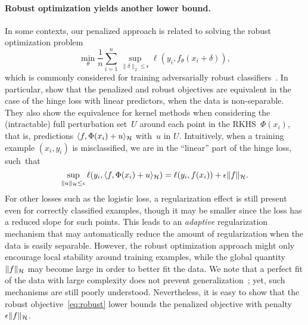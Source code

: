 \paragraph{Robust optimization yields another lower bound.}
In some contexts, our penalized approach is related to solving the robust optimization problem
\begin{equation}
\label{eq:robust}
\min_\theta \frac{1}{n} \sum_{i=1}^n \sup_{\|\delta\|_2 \leq \epsilon} \ell(y_i, f_\theta(x_i + \delta)),
\end{equation}
which is commonly considered for training adversarially robust classifiers~\citep{wong2018provable,madry2018towards,raghunathan2018certified}.
In particular, \citet{xu2009robustness} show that the penalized and
robust objectives are equivalent in the case of the hinge loss with linear predictors,
when the data is non-separable.
They also show the equivalence for kernel methods when considering the (intractable) full perturbation set~$U$
around each point in the RKHS~$\Phi(x_i)$, that is, predictions $\langle f, \Phi(x_i) + u \rangle_{\mathcal H}$ with~$u$ in $U$.
Intuitively, when a training example $(x_i, y_i)$ is misclassified, we are in the ``linear'' part of the hinge loss, such~that
\begin{equation*}
\sup_{\|u\|_{\mathcal H} \leq \epsilon} \ell(y_i, \langle f, \Phi(x_i) + u \rangle_{\mathcal H}) = \ell(y_i, f(x_i)) + \epsilon \|f\|_{{\mathcal H}}.
\end{equation*}
For other losses such as the logistic loss, a regularization effect is still present even
for correctly classified examples,
though it may be smaller since the loss has a reduced slope for such points.
This leads to an \emph{adaptive} regularization mechanism that may automatically reduce
the amount of regularization when the data is easily separable.
However, the robust optimization approach might only encourage local stability around training examples, while the global quantity~$\|f\|_{\mathcal H}$
may become large in order to better fit the data.
We note that a perfect fit of the data with large complexity does not prevent generalization~\citep[see, \eg,][]{belkin2018overfitting,belkin2018understand};
yet, such mechanisms are still poorly understood.
Nevertheless, it is easy to show that the robust objective~\eqref{eq:robust}
lower bounds the penalized objective with penalty~$\epsilon \|f\|_{{\mathcal H}}$.

